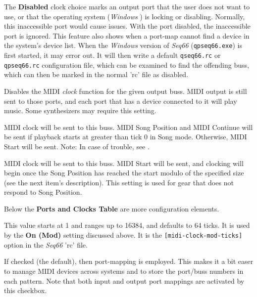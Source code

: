    The \textbf{Disabled} clock choice marks an output port
   that the user does not want to use, or that the operating system
   (\textsl{Windows} \smiley)
   is locking or disabling.
   Normally, this inaccessible port would cause issues.
   With the port disabled, the inaccessible port is ignored.
   This feature also shows when a port-map cannot find a device in the system's
   device list.
   When the \textsl{Windows} version of \textsl{Seq66}
   (\texttt{qpseq66.exe}) is first started, it may error out.
   It will then write a default \texttt{qseq66.rc}
   or \texttt{qpseq66.rc} configuration file,
   which can be examined to find the offending buss, which can then be
   marked in the normal 'rc' file as disabled.

   Disables the MIDI \textsl{clock} function for the given output buss.
   MIDI output is still sent to those ports, and
   each port that has a device connected to it will play music.
   Some synthesizers may require this setting.

   MIDI clock will be sent to this buss.
   MIDI Song Position and MIDI Continue will be sent if playback starts
   at greater than tick 0 in Song mode.  Otherwise, MIDI Start will be sent.
   Note: In case of trouble, see
   .

   MIDI clock will be sent to this buss.
   MIDI Start will be sent, and clocking will begin
   once the Song Position has reached the start modulo of the specified size
   (see the next item's description).
   This setting is used for gear that does not respond to Song Position.

   Below the \textbf{Ports and Clocks Table} are more configuration elements.

   \setcounter{ItemCounter}{0}      %

   This value starts at 1 and ranges up to 16384, and defaults to 64 ticks.
   It is used by the \textbf{On (Mod)} setting discussed above.
   It is the \texttt{[midi-clock-mod-ticks]} option in the \textsl{Seq66}
   'rc' file.

   If checked (the default), then port-mapping is employed.
   This makes it a bit easer to manage MIDI devices across systems and to store
   the port/buss numbers in each pattern.
   Note that both input and output port mappings are activated by this
   checkbox.

